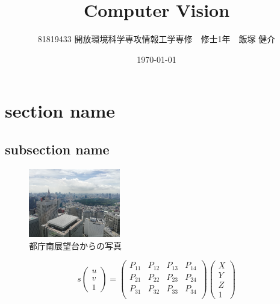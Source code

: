 \documentclass[11pt,a4j]{jsarticle}
\title{Computer Vision}
\author{81819433 開放環境科学専攻情報工学専修　修士1年　飯塚 健介}
\date{\today}
\begin{document}
    \maketitle
    \section{section name}
    \subsection{subsection name}

    \begin{figure}[H]
      \centering
      \includegraphics[clip,width=4.0cm]{img/metro.jpg}
      \caption{都庁南展望台からの写真\label{fig:cute}}
    \end{figure}

    \begin{equation}
        s\left(
        \begin{array}{c}
            u \\
            v \\
            1
        \end{array}
        \right) =
        \left(
    \begin{array}{cccc}
      P_{11} & P_{12} & P_{13} & P_{14}\\
      P_{21} & P_{22} & P_{23} & P_{24} \\
      P_{31} & P_{32} & P_{33} & P_{34} \\
    \end{array}
        \right)
        \left(
        \begin{array}{c}
            X \\
            Y \\
            Z \\
            1
        \end{array}
        \right)
        \label{eq:projection_matrix}
    \end{equation}
\end{document}
